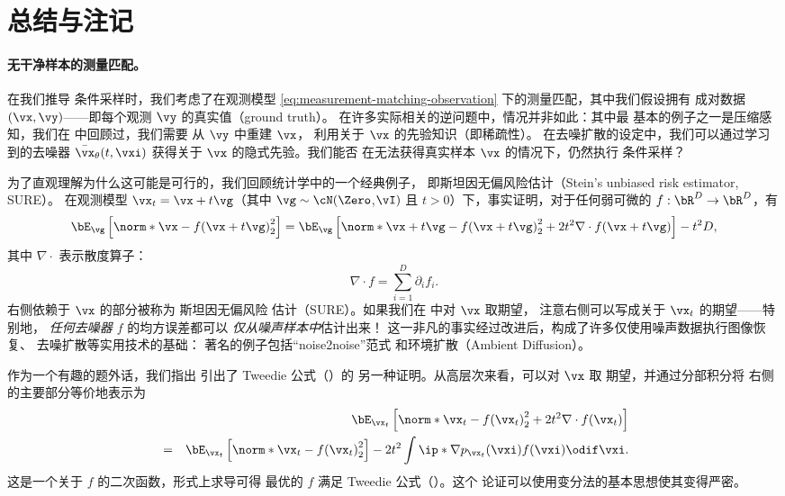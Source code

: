 \documentclass[../../book-main_zh.tex]{subfiles}
\begin{document}
\section{总结与注记}
\paragraph{无干净样本的测量匹配。} 在我们推导
条件采样时，我们考虑了在观测模型
\eqref{eq:measurement-matching-observation} 下的测量匹配，其中我们假设拥有
成对数据 $(\vx, \vy)$——即每个观测 $\vy$ 的真实值（ground truth）。
在许多实际相关的逆问题中，情况并非如此：其中最
基本的例子之一是压缩感知，我们在
 中回顾过，我们需要
从 $\vy$ 中重建 $\vx$，
利用关于 $\vx$ 的先验知识（即稀疏性）。
在去噪扩散的设定中，我们可以通过学习到的去噪器 $\bar{\vx}_{\theta}(t, \vxi)$
获得关于 $\vx$ 的隐式先验。我们能否
在无法获得真实样本 $\vx$ 的情况下，仍然执行
条件采样？

为了直观理解为什么这可能是可行的，我们回顾统计学中的一个经典例子，
即斯坦因无偏风险估计（Stein's unbiased risk estimator, SURE）。
在观测模型 $\vx_t = \vx + t \vg$（其中 $\vg \sim \cN(\Zero$,$
\vI)$ 且 $t>0$）下，事实证明，对于任何弱可微的 $f :
\bR^D \to \bR^D$，有
\begin{equation}\label{eq:sure-risk}
    \bE_{\vg}\left[
        \norm*{\vx - f(\vx + t \vg)}_2^2
    \right]
    =
    \bE_{\vg}\left[
        \norm*{\vx+t\vg - f(\vx + t \vg)}_2^2
        + 2t^2 \nabla \cdot f(\vx + t\vg)
    \right]
    - t^2 D,
\end{equation}
其中 $\nabla \cdot$ 表示散度算子：
\begin{equation*}
    \nabla \cdot f = \sum_{i=1}^D \partial_i f_i.
\end{equation*}
 右侧依赖于 $\vx$ 的部分被称为
斯坦因无偏风险
估计（SURE）。如果我们在  中对 $\vx$ 取期望，
注意右侧可以写成关于 $\vx_t$ 的期望——特别地，
\textit{任何去噪器 $f$} 的均方误差都可以
\textit{仅从噪声样本中}估计出来！
这一非凡的事实经过改进后，构成了许多仅使用噪声数据执行图像恢复、
去噪扩散等实用技术的基础：
著名的例子包括“noise2noise”范式
\cite{pmlr-v80-lehtinen18a}
和环境扩散（Ambient Diffusion）\cite{daras2023ambient}。

作为一个有趣的题外话，我们指出  引出了 Tweedie 公式（）的
另一种证明。从高层次来看，可以对 $\vx$ 取
期望，并通过分部积分将 
右侧的主要部分等价地表示为
\begin{eqnarray}
    &&\bE_{\vx_t}\left[
        \norm*{\vx_t - f(\vx_t)}_2^2
        + 2t^2 \nabla \cdot f(\vx_t)
    \right] \nonumber \\
    &=&
    \bE_{\vx_t}\left[
        \norm*{\vx_t - f(\vx_t)}_2^2
    \right]
    - 2t^2 \int
    \ip*{\nabla p_{\vx_t}(\vxi)}{f(\vxi)}
    \odif \vxi.
\end{eqnarray}
这是一个关于 $f$ 的二次函数，形式上求导可得
最优的 $f$ 满足 Tweedie 公式（）。这个
论证可以使用变分法的基本思想使其变得严密。
\end{document}
